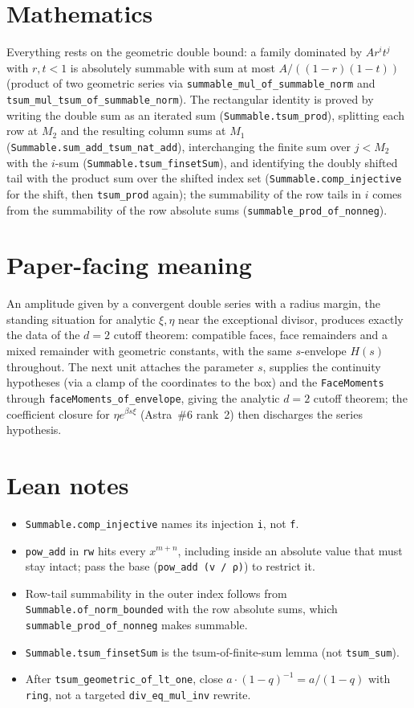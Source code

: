 \documentclass[11pt]{article}
\begin{document}
\section{Mathematics}

Everything rests on the geometric double bound: a family dominated by $Ar^it^j$ with $r,t<1$ is
absolutely summable with sum at most $A/((1-r)(1-t))$ (product of two geometric series via
\texttt{summable\_mul\_of\_summable\_norm} and \texttt{tsum\_mul\_tsum\_of\_summable\_norm}). The
rectangular identity is proved by writing the double sum as an iterated sum (\texttt{Summable.tsum\_prod}),
splitting each row at $M_2$ and the resulting column sums at $M_1$
(\texttt{Summable.sum\_add\_tsum\_nat\_add}), interchanging the finite sum over $j<M_2$ with the
$i$-sum (\texttt{Summable.tsum\_finsetSum}), and identifying the doubly shifted tail with the product
sum over the shifted index set (\texttt{Summable.comp\_injective} for the shift, then
\texttt{tsum\_prod} again); the summability of the row tails in $i$ comes from the summability of the
row absolute sums (\texttt{summable\_prod\_of\_nonneg}).

\section{Paper-facing meaning}

An amplitude given by a convergent double series with a radius margin, the standing situation for
analytic $\xi,\eta$ near the exceptional divisor, produces exactly the data of the $d=2$ cutoff theorem:
compatible faces, face remainders and a mixed remainder with geometric constants, with the same
$s$-envelope $H(s)$ throughout. The next unit attaches the parameter $s$, supplies the continuity
hypotheses (via a clamp of the coordinates to the box) and the \texttt{FaceMoments} through
\texttt{faceMoments\_of\_envelope}, giving the analytic $d=2$ cutoff theorem; the coefficient
closure for $\eta e^{\beta s\xi}$ (Astra~\#6 rank~2) then discharges the series hypothesis.

\section{Lean notes}

\begin{itemize}
\item \texttt{Summable.comp\_injective} names its injection \texttt{i}, not \texttt{f}.
\item \texttt{pow\_add} in \texttt{rw} hits every $x^{m+n}$, including inside an absolute value that
must stay intact; pass the base (\texttt{pow\_add (v / ρ)}) to restrict it.
\item Row-tail summability in the outer index follows from \texttt{Summable.of\_norm\_bounded} with
the row absolute sums, which \texttt{summable\_prod\_of\_nonneg} makes summable.
\item \texttt{Summable.tsum\_finsetSum} is the tsum-of-finite-sum lemma (not \texttt{tsum\_sum}).
\item After \texttt{tsum\_geometric\_of\_lt\_one}, close $a\cdot(1-q)^{-1}=a/(1-q)$ with
\texttt{ring}, not a targeted \texttt{div\_eq\_mul\_inv} rewrite.
\end{itemize}
\end{document}
